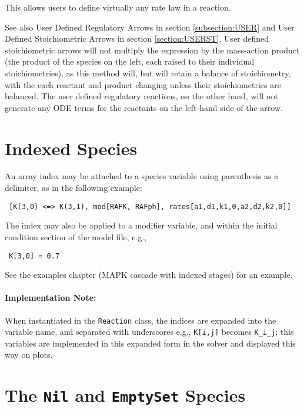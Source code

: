 This allows users to define virtually any rate law in a reaction. 

See also User Defined Regulatory Arrows in section \ref{subsection:USER} and User Defined Stoichiometric Arrows in section \ref{section:USERST}. User defined stoichiometric arrows will not multiply the expression by the mass-action product (the product of the species on the left, each raised to their individual stoichiometries), as this method will, but will retain a balance of stoichiometry, with the each reactant and product changing unless their stoichiometries are balanced. The user defined regulatory reactions, on the other hand, will  not generate any ODE terms for the reactants on the left-hand side of the arrow. 

\section{Indexed Species}

An array index may be attached to a species variable using parenthesis as a delimiter, as in the following example:


{\tt \hspace{.5in} [K(3,0) <=> K(3,1), mod[RAFK, RAFph], rates[a1,d1,k1,0,a2,d2,k2,0]]}

The index may also be applied to a modifier variable, and within the initial condition section of the model file, e.g., 

{\tt \hspace{.5in} K[3,0] = 0.7 }

See the examples chapter (MAPK cascade with indexed stages) for an example. 

\paragraph{Implementation Note:} When instantiated in the {\tt Reaction} class, the indices are expanded into the variable name, and separated with underscores e.g., {\tt K[i,j]} becomes {\tt K\_i\_j}; this variables are implemented in this expanded form in the solver and displayed this way on plots. 


\section[{\tt Nil} \& {\tt EmpytSet} Species] {The {\tt Nil} and {\tt EmptySet} Species}

